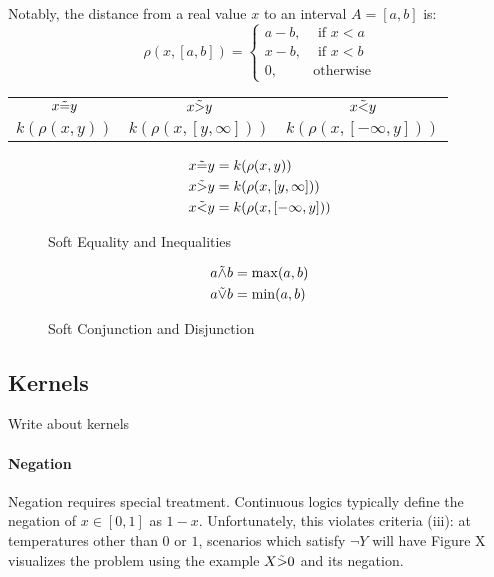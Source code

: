 Notably, the distance from a real value $x$ to an interval $A = [a, b]$ is:
\begin{equation}
\rho(x, [a, b]) =
\begin{cases}
  a - b, & \text{ if } x < a\\
  x - b, & \text{ if } x < b\\
  0,              & \text{otherwise}
\end{cases}
\end{equation}

\begin{center}
\begin{tabular}{ c |  c | c }
  \hline		
  $x \tilde{=} y$ & $x \tilde{>} y$ & $x \tilde{<} y$  \\
  $k(\rho(x, y))$ & $k(\rho(x, [y, \infty]))$ & $k(\rho(x, [-\infty, y]))$ \\
  \hline  
\end{tabular}
\end{center}


\begin{figure}
  \begin{align*}
x \tilde{=} y &= k(\rho(x, y))\\
x \tilde{>} y &= k(\rho(x, [y, \infty]))\\
x \tilde{<} y &= k(\rho(x, [-\infty, y]))
  \end{align*}
\caption{Soft Equality and Inequalities}
\end{figure}


\begin{figure}
  \begin{align*}
a \tilde{\land} b &= \max(a, b)\\
a \tilde{\lor} b &= \min(a, b)
  \end{align*}
\caption{Soft Conjunction and Disjunction}
\end{figure}

\subsection{Kernels}
Write about kernels

\paragraph{Negation}
Negation requires special treatment.
Continuous logics typically define the negation of $x \in [0, 1]$ as $1 - x$.
Unfortunately, this violates criteria (iii): at temperatures other than $0$ or $1$, scenarios which satisfy $\neg Y$ will have 
Figure X visualizes the problem using the example $X \tilde{>} 0$ and its negation.

